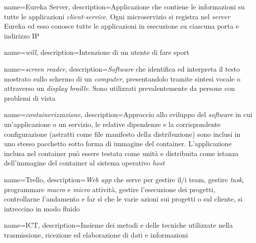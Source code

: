 {
    name={Eureka Server},
    description={Applicazione che contiene le informazioni su tutte le
            applicazioni \textit{client-service}. Ogni \gls{microservizio} si
            registra nel
            \textit{server} Eureka ed esso conosce tutte le
            applicazioni in esecuzione su ciascuna porta e indirizzo \gls{IP}}
}

{
    name={\textit{will}},
    description={Intenzione di un utente di fare sport}
}

{
    name={\textit{screen reader}},
    description={\textit{Software} che identifica ed interpreta il testo
            mostrato sullo schermo di un \textit{computer}, presentandolo
            tramite sintesi
            vocale o attraverso un \textit{display braille}. Sono utilizzati
            prevalentemente da persone con problemi di vista}
}

{
    name={\textit{containerizzazione}},
    description={Approccio allo sviluppo del \textit{software} in cui
            un'applicazione o un servizio, le relative dipendenze e la
            corrispondente
            configurazione (astratti come file manifesto della distribuzione)
            sono inclusi
            in uno stesso pacchetto sotto forma di immagine del
            \gls{container}.
            L'applicazione inclusa nel \gls{container} può essere testata come
            unità e
            distribuita come istanza dell'immagine del \gls{container} al
            sistema operativo
            \textit{host}}
}

{
    name={Trello},
    description={\textit{Web app} che serve per gestire il/i team, gestire
            \textit{task}, programmare \textit{macro} e \textit{micro}
            attività, gestire
            l'esecuzione dei progetti, controllarne l'andamento e far sì che le
            varie
            azioni sui progetti o sul cliente, si intreccino in modo fluido}
}

{
    name={ICT},
    description={Insieme dei metodi e delle tecniche utilizzate nella
            trasmissione, ricezione ed elaborazione di dati e informazioni}
}

